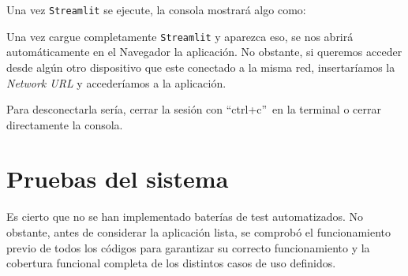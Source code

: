 Una vez \texttt{Streamlit} se ejecute, la consola mostrará algo como:


Una vez cargue completamente \texttt{Streamlit} y aparezca eso, se nos abrirá automáticamente en el Navegador la aplicación. No obstante, si queremos acceder desde algún otro dispositivo que este conectado a la misma red, insertaríamos la \textit{Network URL} y accederíamos a la aplicación.

Para desconectarla sería, cerrar la sesión con ``ctrl+c''\ en la terminal o cerrar directamente la consola.



\section{Pruebas del sistema}
Es cierto que no se han implementado baterías de test automatizados. No obstante, antes de considerar la aplicación lista, se comprobó el funcionamiento previo de todos los códigos para garantizar su correcto funcionamiento y la cobertura funcional completa de los distintos casos de uso definidos.
